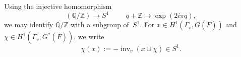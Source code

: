 \documentclass[a4paper,english,12pt]{amsart}
\newcommand{\QQ}{\mathbb{Q}}
\newcommand {\Gm}{\mathbb{G}_m}
\newcommand{\oF}{\overline F}
\newcommand{\ZZ}{\mathbb{Z}}
\newcommand{\Fv}{F_v}
\newcommand{\muu}{\boldsymbol{\mu}}
\DeclareMathOperator{\Hom}{Hom}
\DeclareMathOperator{\Id}{Id}
\DeclareMathOperator{\Frob}{Frob}
\DeclareMathOperator{\un}{un}
\DeclareMathOperator{\inv}{inv}
\numberwithin{equation}{subsection}
\begin{document}
Using the injective homomorphism $$(\QQ/\ZZ)\to S^1\hspace{1cm}q+\ZZ\mapsto \exp(2i\pi q),$$ we may identify $\QQ/\ZZ$ with a subgroup of~$S^1$. %
For $x\in H^1(\Gamma_v, G(\oF))$ and $\chi\in H^1(\Gamma_v, G^*(\oF))$, we write~$$\chi(x):=-\inv_v(x\cup\chi)\in S^1.$$
%
%
%
\end{document}
